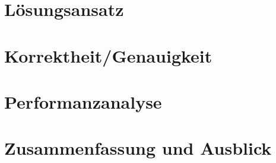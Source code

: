\documentclass[course=erap]{aspdoc}
\begin{document}




\section{Lösungsansatz}


\section{Korrektheit/Genauigkeit}


\section{Performanzanalyse}


\section{Zusammenfassung und Ausblick}


{}
\end{document}
